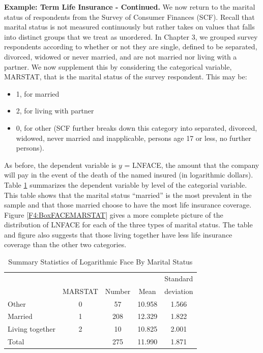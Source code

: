 \textbf{Example: Term Life Insurance - Continued.} We now return to
the marital status of respondents from the Survey of Consumer
Finances (SCF). Recall that marital status is not measured
continuously but rather takes on values that falls into distinct
groups that we treat as unordered. In Chapter 3, we grouped survey
respondents according to whether or not they are single, defined to
be separated, divorced, widowed or never married, and are not
married nor living with a partner. We now supplement this by
considering the categorical variable, MARSTAT, that is the marital
status of the survey respondent. This may be:
\bigskip
\begin{itemize}
 \item 1, for married
 \item 2, for living with partner
 \item 0, for other (SCF further breaks down this category into
 separated, divorced, widowed, never married and inapplicable,
 persons age 17 or less, no further persons).
 \end{itemize}
As before, the dependent variable is $y$ = LNFACE, the amount that
the company will pay in the event of the death of the named insured
(in logarithmic dollars). Table \ref{T4:MaritalSumStats} summarizes
the dependent variable by level of the categorial variable. This
table shows that the marital status ``married'' is the most
prevalent in the sample and that those married choose to have the
most life insurance coverage. Figure \ref{F4:BoxFACEMARSTAT} gives a
more complete picture of the distribution of LNFACE for each of the
three types of marital status. The table and figure also suggests
that those living together have less life insurance coverage than
the other two categories.


\begin{table}[h] \caption{\label{T4:MaritalSumStats} Summary
Statistics of Logarithmic Face By Marital Status}
\begin{tabular}{lcccc}
\hline
&  &  &  & Standard \\
& MARSTAT & Number & Mean & deviation\\\hline
Other           & 0 & 57 & 10.958 & 1.566 \\
Married         & 1 & 208 & 12.329 & 1.822 \\
Living together & 2 & 10 & 10.825 & 2.001 \\ \hline
Total           &   & 275 & 11.990 & 1.871 \\
 \hline
\end{tabular}
\end{table}


